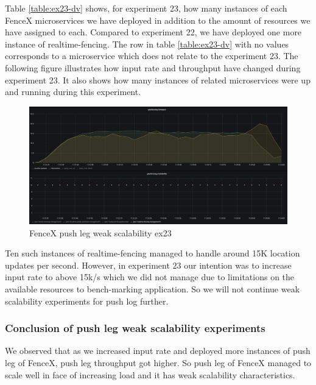\documentclass[a4]{report}
\begin{document}
    Table \ref{table:ex23-dv} shows, for experiment 23, how many instances of each FenceX microservices we have
    deployed in addition to the amount of resources we have assigned to each.
    Compared to experiment 22, we have deployed one more instance of realtime-fencing.
    The row in table \ref{table:ex23-dv} with no values corresponds to a microservice which does not relate to the
    experiment 23.
    The following figure illustrates how input rate and throughput have changed during experiment 23.
    It also shows how many instances of related microservices were up and running during this experiment.

    \begin{figure}
        \caption{FenceX push leg weak scalability ex23}
        \label{fig:ex23}
        \includegraphics[scale=0.5]{images/evaluation/ex23-benchmarking-ongoing-2per2sec.png}
    \end{figure}

    \clearpage

    Ten such instances of realtime-fencing managed to handle around 15K location updates per second.
    However, in experiment 23 our intention was to increase input rate to above 15k/s which we did not manage due to
    limitations on the available resources to bench-marking application.
    So we will not continue weak scalability experiments for push log further.

    \subsubsection{Conclusion of push leg weak scalability experiments}
    We observed that as we increased input rate and deployed more instances of push leg of FenceX, push leg
    throughput got higher.
    So push leg of FenceX managed to scale well in face of increasing load and it has weak scalability characteristics.
\end{document}
